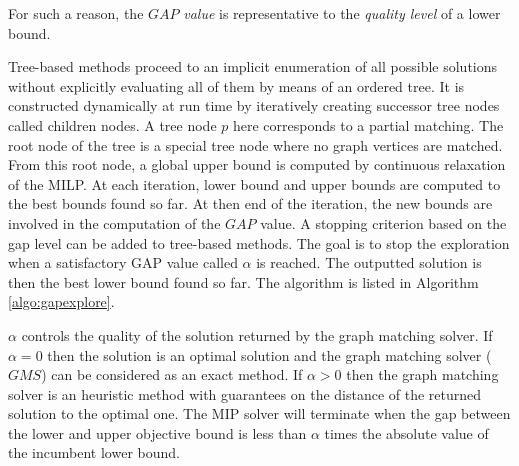\documentclass[times,onecolumn,final,authoryear]{article}
\theoremstyle{definition}
\begin{document}
For such a reason, the $GAP$ \textit{value} is representative to the \textit{quality level} of a lower bound.

Tree-based methods proceed to an implicit enumeration of all possible solutions without explicitly evaluating all of them by means of an ordered tree. It is constructed dynamically at run time by iteratively creating successor tree nodes called children
nodes. A tree node $p$ here corresponds to a partial matching. The root node of the tree is a special tree node where no graph vertices are matched. From this root node, a global upper bound is computed by continuous relaxation of the MILP. At each iteration, lower bound and upper bounds are computed to the best bounds found so far. At then end of the iteration, the new bounds are involved in the computation of the $GAP$ value. 
A stopping criterion based on the gap level can be added to tree-based methods. The goal is to stop the exploration when a satisfactory GAP value called $\alpha$ is reached. The outputted solution is then the best lower bound found so far. The algorithm is listed in Algorithm \ref{algo:gapexplore}.

$\alpha$ controls the quality of the solution returned by the graph matching solver. If $\alpha=0$ then the solution is an optimal solution and the graph matching solver ($GMS$) can be considered as an exact method. If $\alpha > 0$ then the graph matching solver is an heuristic method with guarantees on the distance of the returned solution to the optimal one. The MIP solver will terminate when the gap between the lower and upper objective bound is less than $\alpha$ times the absolute value of the incumbent lower bound.
\end{document}
